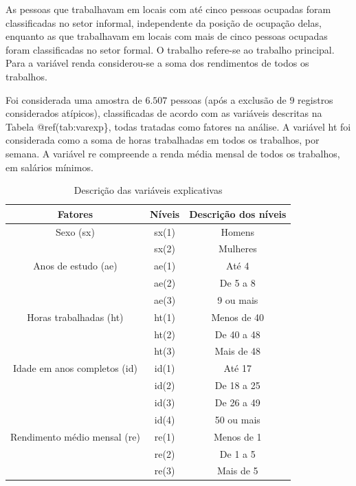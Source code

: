 \documentclass[]{book}
\numberwithin{example}{chapter}
\numberwithin{remark}{chapter}
\numberwithin{definition}{chapter}
\begin{document}
As pessoas que trabalhavam em locais com até cinco pessoas ocupadas
foram classificadas no setor informal, independente da posição de
ocupação delas, enquanto as que trabalhavam em locais com mais de cinco
pessoas ocupadas foram classificadas no setor formal. O trabalho
refere-se ao trabalho principal. Para a variável renda considerou-se a
soma dos rendimentos de todos os trabalhos.

Foi considerada uma amostra de \(6.507\) pessoas (após a exclusão de
\(9\) registros considerados atípicos), classificadas de acordo com as
variáveis descritas na Tabela @ref(tab:varexp\}, todas tratadas como
fatores na análise. A variável ht foi considerada como a soma de horas
trabalhadas em todos os trabalhos, por semana. A variável re compreende
a renda média mensal de todos os trabalhos, em salários mínimos.

\begin{center}
\begin{table}[tbp] \centering%
\caption{Descrição das variáveis explicativas }\bigskip \label{tab61}
\begin{tabular}{|c|c|c|}
\hline\hline
\textbf{Fatores} & \textbf{Níveis} & \textbf{Descrição dos
níveis} \\ \hline\hline
Sexo (sx) & sx(1) & Homens \\
& sx(2) & Mulheres \\ \hline
Anos de estudo (ae) & ae(1) & Até 4 \\
& ae(2) & De 5 a 8 \\
& ae(3) & 9 ou mais \\ \hline
Horas trabalhadas (ht) & ht(1) & Menos de 40 \\
& ht(2) & De 40 a 48 \\
& ht(3) & Mais de 48 \\ \hline
Idade em anos completos (id) & id(1) & Até 17 \\
& id(2) & De 18 a 25 \\
& id(3) & De 26 a 49 \\
& id(4) & 50 ou mais \\ \hline
Rendimento médio mensal (re) & re(1) & Menos de 1 \\
& re(2) & De 1 a 5 \\
& re(3) & Mais de 5 \\ \hline\hline
\end{tabular}
\end{table}%
\end{center}
\end{document}

